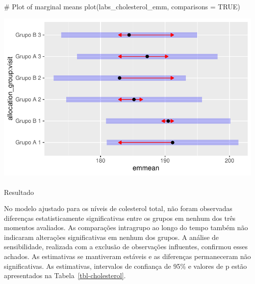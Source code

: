 \documentclass[
  12pt,
]{article}
\makeatletter
\let\oldparagraph\paragraph
\renewcommand{\paragraph}{
    \@ifstar
      \xxxParagraphStar
      \xxxParagraphNoStar
  }
\newcommand{\xxxParagraphStar}[1]{\oldparagraph*{#1}\mbox{}}
\newcommand{\xxxParagraphNoStar}[1]{\oldparagraph{#1}\mbox{}}
\newenvironment{Shaded}{\begin{snugshade}}{\end{snugshade}}
\newcommand{\AttributeTok}[1]{\textcolor[rgb]{0.40,0.45,0.13}{#1}}
\newcommand{\CommentTok}[1]{\textcolor[rgb]{0.37,0.37,0.37}{#1}}
\newcommand{\ConstantTok}[1]{\textcolor[rgb]{0.56,0.35,0.01}{#1}}
\newcommand{\FunctionTok}[1]{\textcolor[rgb]{0.28,0.35,0.67}{#1}}
\newcommand{\NormalTok}[1]{\textcolor[rgb]{0.00,0.23,0.31}{#1}}
\makeatother
\begin{document}
\begin{Shaded}
\begin{Highlighting}[]
\CommentTok{\# Plot of marginal means}
\FunctionTok{plot}\NormalTok{(labs\_cholesterol\_emm, }\AttributeTok{comparisons =} \ConstantTok{TRUE}\NormalTok{)}
\end{Highlighting}
\end{Shaded}

\includegraphics{Outcomes_files/figure-pdf/labs_cholesterol_sens_emm-1.pdf}

\paragraph{Resultado}\label{resultado-4}

No modelo ajustado para os níveis de colesterol total, não foram
observadas diferenças estatisticamente significativas entre os grupos em
nenhum dos três momentos avaliados. As comparações intragrupo ao longo
do tempo também não indicaram alterações significativas em nenhum dos
grupos. A análise de sensibilidade, realizada com a exclusão de
observações influentes, confirmou esses achados. As estimativas se
mantiveram estáveis e as diferenças permaneceram não significativas. As
estimativas, intervalos de confiança de 95\% e valores de p estão
apresentados na Tabela~\ref{tbl-cholesterol}.
\end{document}
